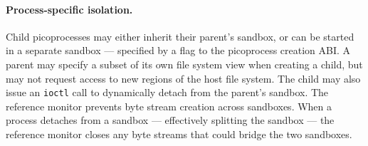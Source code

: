 \paragraph{Process-specific isolation.} 
Child picoprocesses may either inherit their parent's sandbox, 
or can be started in a separate sandbox
--- specified by a flag to the picoprocess creation ABI.
A parent may specify a subset of its own file system view 
when creating a child, but may not request access to new regions of the 
host file system. 
The child may also issue an {\tt ioctl} call to 
dynamically detach from the parent's sandbox. The reference monitor prevents byte stream creation 
across sandboxes.
When a process detaches from a sandbox --- effectively splitting the sandbox ---
the reference monitor closes
any byte streams that could bridge the two sandboxes.


\begin{comment}
We hasten to note that program counter filtering
is only provided for backwards compatibility, not security.
An attacker can compromise the \pal{}, so system policies are enforced
externally by the reference monitor.


Dynamically redirecting system calls to {\tt libLinux} is 
less efficient than dynamically linking against
the \graphene{} libc or statically compiling {\tt libLinux} into the application.
The overhead of dynamic redirection comes from 
transferring control to the kernel, then back to 
the \pal{}, and then to {\tt libLinux}.
We leave exploration of more efficient alternatives for future work,
such as redirecting the hardware system call table to {\tt libLinux}
on a host system like Dune~\cite{belay12dune},
or dynamically rewriting parts of the static binary~\cite{hunt99detours}.
\end{comment}


